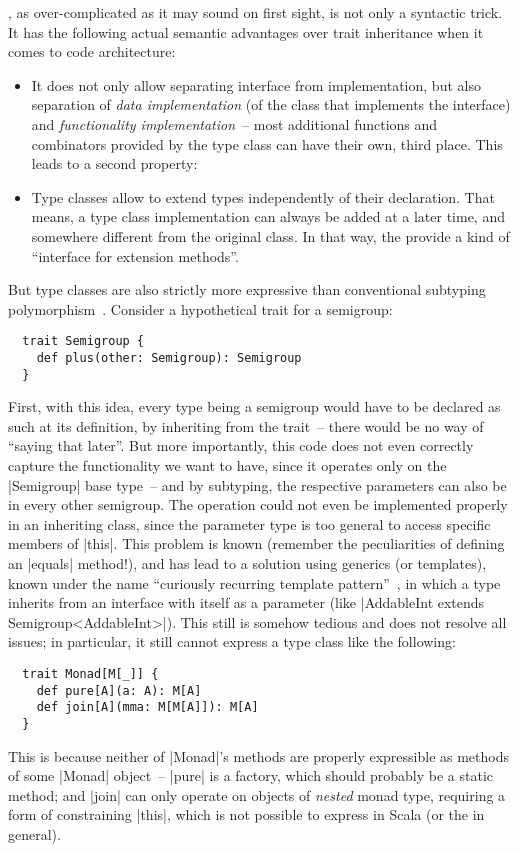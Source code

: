 , as over-complicated as it may sound on first sight, is not only
a syntactic trick. It has the following actual semantic advantages over trait inheritance when it
comes to code architecture:
\begin{itemize}
\item It does not only allow separating interface from implementation, but also separation of
  \emph{data implementation} (of the class that implements the interface) and \emph{functionality
    implementation}~-- most additional functions and combinators provided by the type class can have
  their own, third place. This leads to a second property:
\item Type classes allow to extend types independently of their declaration. That means, a type
  class implementation can always be added at a later time, and somewhere different from the
  original class. In that way, the provide a kind of \enquote{interface for extension methods}.
\end{itemize}

But type classes are also strictly more expressive than conventional subtyping
polymorphism~\cite{wadler1989:ad-hoc}. Consider a hypothetical trait for a semigroup:
\begin{lstlisting}
  trait Semigroup {
    def plus(other: Semigroup): Semigroup
  }
\end{lstlisting}
First, with this idea, every type being a semigroup would have to be declared as such at its
definition, by inheriting from the trait~-- there would be no way of \enquote{saying that
  later}. But more importantly, this code does not even correctly capture the functionality we want
to have, since it operates only on the |Semigroup| base type~-- and by subtyping, the respective
parameters can also be in every other semigroup. The operation could not even be implemented
properly in an inheriting class, since the parameter type is too general to access specific members
of |this|. This problem is known (remember the peculiarities of defining an |equals| method!), and
has lead to a solution using generics (or templates), known under the name \enquote{curiously
  recurring template pattern}~\cite{coplien1995:template}, in which a type inherits from an
interface with itself as a parameter (like |AddableInt extends Semigroup<AddableInt>|). This still
is somehow tedious and does not resolve all issues; in particular, it still cannot express a type
class like the following:
\begin{lstlisting}
  trait Monad[M[_]] {
    def pure[A](a: A): M[A]
    def join[A](mma: M[M[A]]): M[A]
  }
\end{lstlisting}
This is because neither of |Monad|'s methods are properly expressible as methods of some |Monad|
object~-- |pure| is a factory, which should probably be a static method; and |join| can only operate
on objects of \emph{nested} monad type, requiring a form of constraining |this|, which is not
possible to express in Scala (or the  in general).

